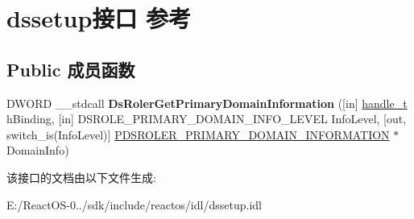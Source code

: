 \hypertarget{interfacedssetup}{}\section{dssetup接口 参考}
\label{interfacedssetup}
\subsection*{Public 成员函数}
\begin{DoxyCompactItemize}
\item 
\mbox{\label{interfacedssetup_aa5f211812626e72423b5bc03679e1fb2}} 
D\+W\+O\+RD \+\_\+\+\_\+stdcall {\bfseries Ds\+Roler\+Get\+Primary\+Domain\+Information} (\mbox{[}in\mbox{]} \hyperlink{interfacevoid}{handle\+\_\+t} h\+Binding, \mbox{[}in\mbox{]} D\+S\+R\+O\+L\+E\+\_\+\+P\+R\+I\+M\+A\+R\+Y\+\_\+\+D\+O\+M\+A\+I\+N\+\_\+\+I\+N\+F\+O\+\_\+\+L\+E\+V\+EL Info\+Level, \mbox{[}out, switch\+\_\+is(Info\+Level)\mbox{]} \hyperlink{union___d_s_r_o_l_e_r___p_r_i_m_a_r_y___d_o_m_a_i_n___i_n_f_o_r_m_a_t_i_o_n}{P\+D\+S\+R\+O\+L\+E\+R\+\_\+\+P\+R\+I\+M\+A\+R\+Y\+\_\+\+D\+O\+M\+A\+I\+N\+\_\+\+I\+N\+F\+O\+R\+M\+A\+T\+I\+ON} $\ast$Domain\+Info)
\end{DoxyCompactItemize}


该接口的文档由以下文件生成\+:\begin{DoxyCompactItemize}
\item 
E\+:/\+React\+O\+S-\/0../sdk/include/reactos/idl/dssetup.\+idl\end{DoxyCompactItemize}
